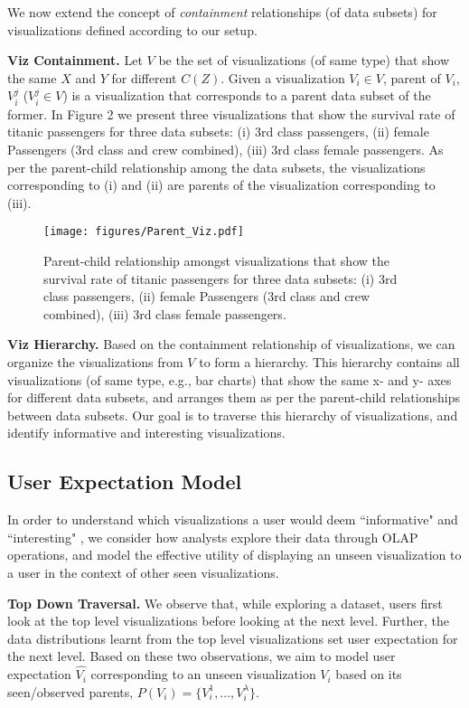 We now extend the concept of \emph{containment} relationships (of data subsets) for visualizations defined according to our setup. 

\textbf{Viz Containment.} Let $V$ be the set of visualizations (of same type) that show the same $X$ and $Y$ for different $C(Z)$. Given a visualization $V_i \in V$, parent of $V_i$, $V_i^j$ ($V_i^j\in V$) is a visualization that corresponds to a parent data subset of the former. In Figure 2 we present three visualizations that show the survival rate of titanic passengers for three data subsets: (i) 3rd class passengers, (ii) female Passengers (3rd class and crew combined), (iii) 3rd class female passengers. As per the parent-child relationship among the data subsets, the visualizations corresponding to (i) and (ii) are parents of the visualization corresponding to (iii). %

\begin{figure}[bht]
\label{example}
\centering
\texttt{[image: figures/Parent\_Viz.pdf]}
\caption{Parent-child relationship amongst visualizations that show the survival rate of titanic passengers for three data subsets: (i) 3rd class passengers, (ii) female Passengers (3rd class and crew combined), (iii) 3rd class female passengers.}
\end{figure}

\textbf{Viz Hierarchy.} Based on the containment relationship of visualizations, we can organize the visualizations from $V$ to form a hierarchy. This hierarchy contains all visualizations (of same type, e.g., bar charts) that show the same x- and y- axes for different data subsets, and arranges them as per the parent-child relationships between data subsets. Our goal is to traverse this hierarchy of visualizations, and identify informative and interesting visualizations.

\subsection{User Expectation Model}
In order to understand which visualizations a user would deem ``informative" and ``interesting" , we consider how analysts explore their data through OLAP operations, and model the effective utility of displaying an unseen visualization to a user in the context of other seen visualizations. 
 
\textbf{Top Down Traversal.} We observe that, while exploring a dataset, users first look at the top level visualizations before looking at the next level. Further, the data distributions learnt from the top level visualizations set user expectation for the next level. Based on these two observations, we aim to model user expectation $\hat{V_i}$ corresponding to an unseen visualization $V_i$ based on its seen/observed parents, $P(V_i) = \{V_i^1, \ldots, V_i^\lambda\}$. 

